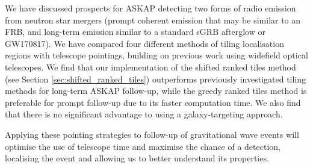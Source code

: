 We have discussed prospects for ASKAP detecting two forms of radio emission from neutron star mergers (prompt coherent emission that may be similar to an FRB, and long-term emission similar to a standard sGRB afterglow or GW170817). We have compared four different methods of tiling localisation regions with telescope pointings, building on previous work using widefield optical telescopes. We find that our implementation of the shifted ranked tiles method (see Section \ref{sec:shifted_ranked_tiles}) outperforms previously investigated tiling methods for long-term ASKAP follow-up, while the greedy ranked tiles method \citep[see Section \ref{sec:greedy_ranked_tiles} \&][]{2017PASP..129k4503G} is preferable for prompt follow-up due to its faster computation time. We also find that there is no significant advantage to using a galaxy-targeting approach.

Applying these pointing strategies to follow-up of gravitational wave events will optimise the use of telescope time and maximise the chance of a detection, localising the event and allowing us to better understand its properties.









